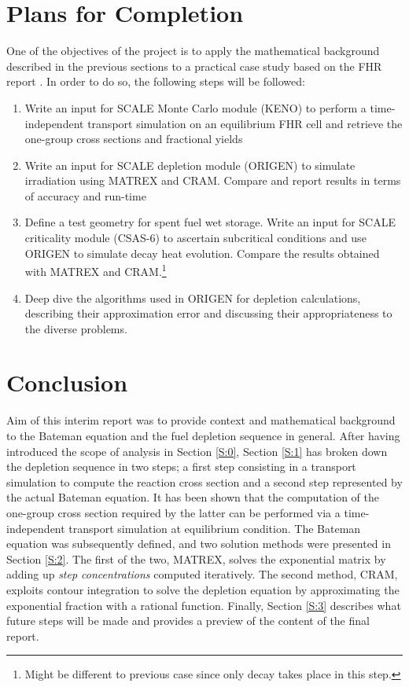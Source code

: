 \documentclass[a4paper,titlepage]{article}
\begin{document}
\section{Plans for Completion}
One of the objectives of the project is to apply the mathematical background described in the previous sections to a practical case study based on the FHR report \cite{cisneros2013pebble}. In order to do so, the following steps will be followed:
\begin{enumerate}
    \item Write an input for SCALE Monte Carlo module (KENO) to perform a time-independent transport simulation on an equilibrium FHR cell and retrieve the one-group cross sections and fractional yields
    \item Write an input for SCALE depletion module (ORIGEN) to simulate irradiation using MATREX and CRAM. Compare and report results in terms of accuracy and run-time
    \item Define a test geometry for spent fuel wet storage. Write an input for SCALE criticality module (CSAS-6) to ascertain subcritical conditions and use ORIGEN to simulate decay heat evolution. Compare the results obtained with MATREX and CRAM.\footnote{Might be different to previous case since only decay takes place in this step.}
    \item Deep dive the algorithms used in ORIGEN for depletion calculations, describing their approximation error and discussing their appropriateness to the diverse problems. 
\end{enumerate}
\label{S:3}
\section{Conclusion}
\label{S:5}
Aim of this interim report was to provide context and mathematical background to the Bateman equation and the fuel depletion sequence in general. After having introduced the scope of analysis in Section \ref{S:0}, Section \ref{S:1} has broken down the depletion sequence in two steps; a first step consisting in a transport simulation to compute the reaction cross section and a second step represented by the actual Bateman equation. It has been shown that the computation of the one-group cross section required by the latter can be performed via a time-independent transport simulation at equilibrium condition. The Bateman equation was subsequently defined, and two solution methods were presented in Section \ref{S:2}. The first of the two, MATREX, solves the exponential matrix by adding up \textit{step concentrations} computed iteratively. The second method, CRAM, exploits contour integration to solve the depletion equation by approximating the exponential fraction with a rational function.
Finally, Section \ref{S:3} describes what future steps will be made and provides a preview of the content of the final report.
\end{document}
